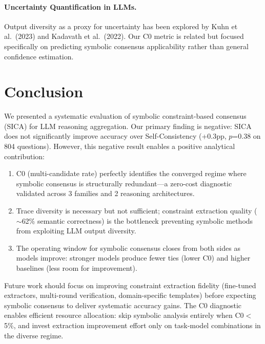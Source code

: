 \documentclass[11pt,a4paper]{article}
\begin{document}
\paragraph{Uncertainty Quantification in LLMs.} Output diversity as a proxy for uncertainty has been explored by Kuhn et al.\ (2023) and Kadavath et al.\ (2022). Our C0 metric is related but focused specifically on predicting symbolic consensus applicability rather than general confidence estimation.

\section{Conclusion}

We presented a systematic evaluation of symbolic constraint-based consensus (SICA) for LLM reasoning aggregation. Our primary finding is negative: SICA does not significantly improve accuracy over Self-Consistency (+0.3pp, $p$=0.38 on 804 questions). However, this negative result enables a positive analytical contribution:

\begin{enumerate}
\item C0 (multi-candidate rate) perfectly identifies the converged regime where symbolic consensus is structurally redundant---a zero-cost diagnostic validated across 3 families and 2 reasoning architectures.
\item Trace diversity is necessary but not sufficient; constraint extraction quality ($\sim$62\% semantic correctness) is the bottleneck preventing symbolic methods from exploiting LLM output diversity.
\item The operating window for symbolic consensus closes from both sides as models improve: stronger models produce fewer ties (lower C0) and higher baselines (less room for improvement).
\end{enumerate}

Future work should focus on improving constraint extraction fidelity (fine-tuned extractors, multi-round verification, domain-specific templates) before expecting symbolic consensus to deliver systematic accuracy gains. The C0 diagnostic enables efficient resource allocation: skip symbolic analysis entirely when C0$<$5\%, and invest extraction improvement effort only on task-model combinations in the diverse regime.
\end{document}
